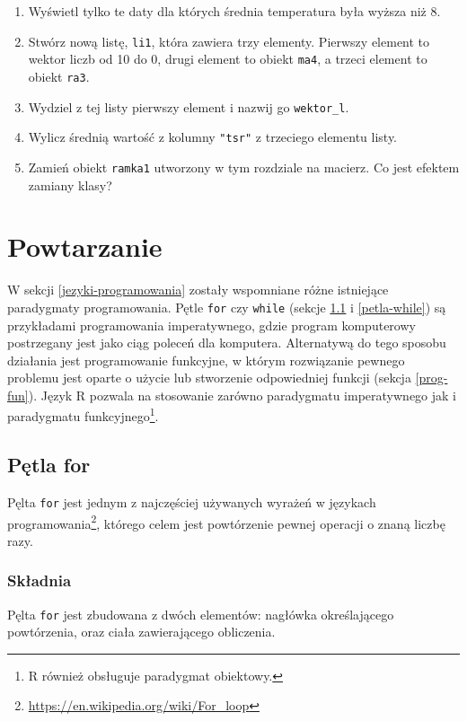 \documentclass[paper=6in:9in,pagesize=pdftex,headinclude=on,footinclude=on,10pt]{scrbook}
\begin{document}
\begin{enumerate}
\item
  Wyświetl tylko te daty dla których średnia temperatura była wyższa niż 8.
\item
  Stwórz nową listę, \texttt{li1}, która zawiera trzy elementy.
  Pierwszy element to wektor liczb od 10 do 0, drugi element to obiekt \texttt{ma4}, a trzeci element to obiekt \texttt{ra3}.
\item
  Wydziel z tej listy pierwszy element i nazwij go \texttt{wektor\_l}.
\item
  Wylicz średnią wartość z kolumny \texttt{"tsr"} z trzeciego elementu listy.
\item
  Zamień obiekt \texttt{ramka1} utworzony w tym rozdziale na macierz.
  Co jest efektem zamiany klasy?
\end{enumerate}

\hypertarget{petle}{%
\chapter{Powtarzanie}\label{petle}}

W sekcji \ref{jezyki-programowania} zostały wspomniane różne istniejące paradygmaty programowania.
Pętle \texttt{for} czy \texttt{while} (sekcje \ref{petla-for} i \ref{petla-while}) są przykładami programowania imperatywnego, gdzie program komputerowy postrzegany jest jako ciąg poleceń dla komputera.
Alternatywą do tego sposobu działania jest programowanie funkcyjne, w którym rozwiązanie pewnego problemu jest oparte o użycie lub stworzenie odpowiedniej funkcji (sekcja \ref{prog-fun}).
Język R pozwala na stosowanie zarówno paradygmatu imperatywnego jak i paradygmatu funkcyjnego\footnote{R również obsługuje paradygmat obiektowy.}.

\hypertarget{petla-for}{%
\section{Pętla for}\label{petla-for}}

Pęlta \texttt{for} jest jednym z najczęściej używanych wyrażeń w językach programowania\footnote{\url{https://en.wikipedia.org/wiki/For_loop}}, którego celem jest powtórzenie pewnej operacji o znaną liczbę razy.

\hypertarget{skux142adnia}{%
\subsection{Składnia}\label{skux142adnia}}

Pęlta \texttt{for} jest zbudowana z dwóch elementów: nagłówka określającego powtórzenia, oraz ciała zawierającego obliczenia.
\end{document}
